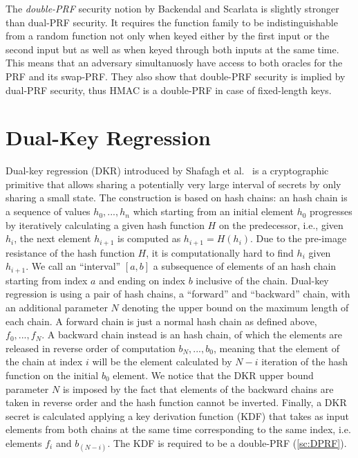 The \textit{double-PRF} security notion by Backendal and Scarlata 
is slightly stronger than dual-PRF security.
It requires the function family to be indistinguishable from a random 
function not only when keyed either by the first input or the second input
but as well as when keyed through both inputs at the same time.
This means that an adversary simultanuosly have access to both 
oracles for the PRF and its swap-PRF.
They also show that double-PRF security is implied by dual-PRF security,
thus HMAC is a double-PRF in case of fixed-length keys.

\section{Dual-Key Regression}\label{sc:DKR}

Dual-key regression (DKR) introduced by Shafagh et al.~\cite{USENIX:SBRH20} is a
cryptographic primitive that allows sharing a potentially very large interval 
of secrets by only sharing a small state.
The construction is based on hash chains: an hash chain is a sequence of values
$h_{0}, ..., h_{n}$ which starting from an initial
element $h_0$ progresses by iteratively calculating
a given hash function $H$ on the predecessor,
i.e., given $h_i$, the next element $h_{i+1}$ is computed as $h_{i+1} = H(h_i)$.
Due to the pre-image resistance of the hash function $H$, 
it is computationally hard to find $h_i$ given $h_{i+1}$.
We call an ``interval'' $[a, b]$ a subsequence of elements
of an hash chain starting from index $a$ and ending
on index $b$ inclusive of the chain.  
Dual-key regression is using a pair of hash chains,
a ``forward'' and ``backward'' chain, with an additional
parameter $N$ denoting the
upper bound on the maximum length of each chain.
A forward chain is just a normal hash chain as defined
above, $f_{0}, ..., f_{N}$.
A backward chain instead is an hash chain, of which the
elements are released in reverse order of computation
$b_{N}, ..., b_{0}$, meaning that the element of the chain 
at index $i$ will be the element calculated by $N - i$
iteration of the hash function on the initial $b_{0}$
element. We notice that the DKR upper bound parameter
$N$ is imposed by the
fact that elements of the backward chains are taken in
reverse order and the hash function cannot be inverted.
Finally, a DKR secret is calculated applying
a key derivation function (KDF) that takes
as input elements from both chains at the same
time corresponding to the same index, i.e.\!
elements $f_{i}$ and $b_{(N - i)}$.
The KDF is required to be a double-PRF (\cref{sc:DPRF}).

